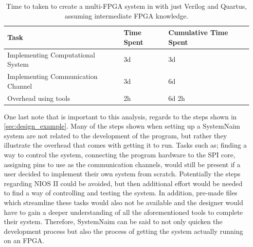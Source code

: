 \begin{table}[]
\begin{tabular}{l|l|l}
Task                               & Time Spent & Cumulative Time Spent \\ \hline
Implementing Computational System  & 3d         & 3d                    \\
Implementing Communication Channel & 3d         & 6d                    \\
Overhead using tools               & 2h         & 6d 2h                
\end{tabular}
\caption{Time to taken to create a multi-FPGA system in with just Verilog and Quartus, assuming intermediate FPGA knowledge.}
\label{tbl:time_custom}
\end{table}


One last note that is important to this analysis, regards to the steps shown in \autoref{sec:design_example}. Many of the steps shown when setting up a SystemNaim system are not related to the development of the program, but rather they illustrate the overhead that comes with getting it to run. Tasks such as; finding a way to control the system, connecting the program hardware to the SPI core, assigning pins to use as the communication channels, would still be present if a user decided to implement their own system from scratch. Potentially the steps regarding NIOS II could be avoided, but then additional effort would be needed to find a way of controlling and testing the system. In addition, pre-made files which streamline these tasks would also not be available and the designer would have to gain a deeper understanding of all the aforementioned tools to complete their system. Therefore, SystemNaim can be said to not only quicken the development process but also the process of getting the system actually running on an FPGA.








